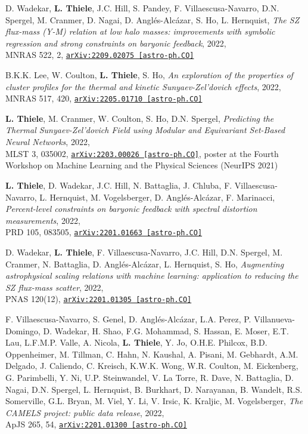 D. Wadekar, {\bf L. Thiele}, J.C. Hill, S. Pandey, F. Villaescusa-Navarro,
D.N. Spergel, M. Cranmer, D. Nagai, D. Angl\'es-Alc\'azar, S. Ho, L. Hernquist,
\emph{The SZ flux-mass (Y-M) relation at low halo masses: improvements with
      symbolic regression and strong constraints on baryonic feedback}, 2022,\\
MNRAS 522, 2,
\href{https://arxiv.org/abs/2209.02075}{\mbox{\texttt{arXiv:2209.02075 [astro-ph.CO]}}}

B.K.K. Lee, W. Coulton, {\bf L. Thiele}, S. Ho,
\emph{An exploration of the properties of cluster profiles for the thermal
      and kinetic Sunyaev-Zel'dovich effects}, 2022,\\
MNRAS 517, 420,
\href{https://arxiv.org/abs/2205.01710}{\mbox{\texttt{arXiv:2205.01710 [astro-ph.CO]}}}

{\bf L. Thiele}, M. Cranmer, W. Coulton, S. Ho, D.N. Spergel,
\emph{Predicting the Thermal Sunyaev-Zel'dovich Field
      using Modular and Equivariant Set-Based Neural Networks}, 2022,\\
MLST 3, 035002,
\href{https://arxiv.org/abs/2203.00026}{\mbox{\texttt{arXiv:2203.00026 [astro-ph.CO]}}},
poster at the Fourth Workshop on Machine Learning and the Physical Sciences (NeurIPS 2021)

{\bf L. Thiele}, D. Wadekar, J.C. Hill, N. Battaglia, J. Chluba,
F. Villaescusa-Navarro, L. Hernquist, M. Vogelsberger, D. Angl\'es-Alc\'azar,
F. Marinacci,
\emph{Percent-level constraints on baryonic feedback with spectral distortion
      measurements}, 2022,\\
PRD 105, 083505,
\href{https://arxiv.org/abs/2201.01663}{\mbox{\texttt{arXiv:2201.01663 [astro-ph.CO]}}}

\newpage
\vspace*{0.5cm}

D. Wadekar, {\bf L. Thiele}, F. Villaescusa-Navarro, J.C. Hill, D.N. Spergel,
M. Cranmer, N. Battaglia, D. Angl\'es-Alc\'azar, L. Hernquist, S. Ho,
\emph{Augmenting astrophysical scaling relations with machine learning:
      application to reducing the SZ flux-mass scatter}, 2022,\\
PNAS 120(12),
\href{https://arxiv.org/abs/2201.01305}{\mbox{\texttt{arXiv:2201.01305 [astro-ph.CO]}}}

F. Villaescusa-Navarro, S. Genel, D. Angl\'es-Alc\'azar,
L.A. Perez, P. Villanueva-Domingo, D. Wadekar, H. Shao,
F.G. Mohammad, S. Hassan, E. Moser, E.T. Lau, L.F.M.P. Valle, A. Nicola,
{\bf L. Thiele}, Y. Jo, O.H.E. Philcox, B.D. Oppenheimer, M. Tillman, C. Hahn,
N. Kaushal, A. Pisani, M. Gebhardt, A.M. Delgado, J. Caliendo,
C. Kreisch, K.W.K. Wong, W.R. Coulton, M. Eickenberg,
G. Parimbelli, Y. Ni, U.P. Steinwandel, V. La Torre,
R. Dave, N. Battaglia, D. Nagai, D.N. Spergel, L. Hernquist, B. Burkhart,
D. Narayanan, B. Wandelt, R.S. Somerville, G.L. Bryan, M. Viel, Y. Li, V. Irsic,
K. Kraljic, M. Vogelsberger,
\emph{The CAMELS project: public data release}, 2022,\\
ApJS 265, 54,
\href{https://arxiv.org/abs/2201.01300}{\mbox{\texttt{arXiv:2201.01300 [astro-ph.CO]}}}

